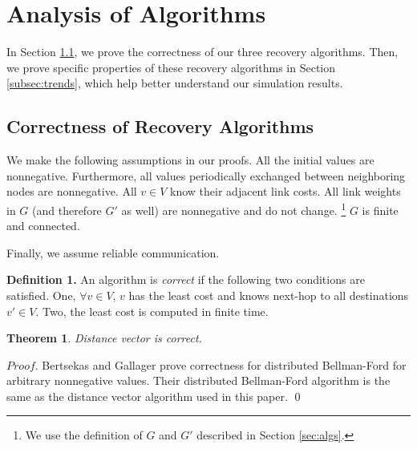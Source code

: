 \section{Analysis of Algorithms}
\label{sec:analysis}

In Section \ref{subsec:correct}, we prove the correctness of our three
recovery algorithms.  Then, we prove specific properties of these
recovery algorithms in Section \ref{subsec:trends}, which help better
understand our simulation results.

\subsection{Correctness of Recovery Algorithms}
\label{subsec:correct}

We make the following assumptions in our proofs. All the initial \dmatrix values are nonnegative. Furthermore, all \minv values periodically
exchanged between neighboring nodes are nonnegative. 
All $v \in V$ know their adjacent link costs. All link weights in $G$ (and therefore $G'$ as well) are nonnegative and do not change.
{\footnote {\small We use the definition of $G$ and $G'$ described in Section \ref{sec:algs}.}}
$G$ is finite and connected. 

Finally, we assume reliable communication.


{\bf Definition 1.} An algorithm is \emph{correct} if the following two conditions are satisfied. One, $\forall v \in V$, $v$ has the least cost and knows next-hop to all destinations $v' \in V$.
Two, the least cost is computed in finite time.



{\bf Theorem 1}. {\it Distance vector is correct.}

$Proof$. Bertsekas and Gallager \cite{Gall87} prove correctness for distributed Bellman-Ford for arbitrary nonnegative \dmatrix values. 
Their distributed Bellman-Ford algorithm is the same as the distance vector algorithm used in this paper. \qed

